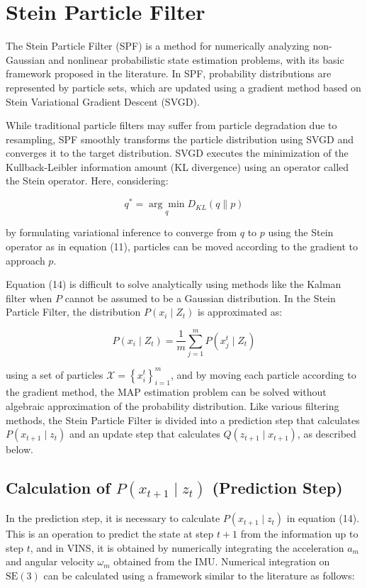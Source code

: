 \documentclass[a4paper,fleqn,10pt,twocolumn]{SICE_ISCS}
\begin{document}
\section{Stein Particle Filter}
The Stein Particle Filter (SPF) is a method for numerically analyzing non-Gaussian and nonlinear probabilistic state estimation problems, with its basic framework proposed in the literature\cite{SPF}. In SPF, probability distributions are represented by particle sets, which are updated using a gradient method based on Stein Variational Gradient Descent (SVGD).

While traditional particle filters may suffer from particle degradation due to resampling, SPF smoothly transforms the particle distribution using SVGD and converges it to the target distribution. SVGD executes the minimization of the Kullback-Leibler information amount (KL divergence) using an operator called the Stein operator. Here, considering:

\begin{equation}
q^{*}=\underset{q}{\arg \min } D_{K L}(q \| p)
\end{equation}

by formulating variational inference to converge from $q$ to $p$ using the Stein operator as in equation (11), particles can be moved according to the gradient to approach $p$.

Equation (14) is difficult to solve analytically using methods like the Kalman filter when $P$ cannot be assumed to be a Gaussian distribution. In the Stein Particle Filter, the distribution $P\left(x_{i} \mid Z_{t}\right)$ is approximated as:

\begin{equation}
P\left(x_{i} \mid Z_{t}\right)=\frac{1}{m} \sum_{j=1}^{m} P\left(x_{j}^{t} \mid Z_{t}\right)
\end{equation}

using a set of particles $\mathcal{X}=\left\{x_{i}^{t}\right\}_{i=1}^{m}$, and by moving each particle according to the gradient method, the MAP estimation problem can be solved without algebraic approximation of the probability distribution. Like various filtering methods, the Stein Particle Filter is divided into a prediction step that calculates $P\left(x_{t+1} \mid z_{t}\right)$ and an update step that calculates $Q\left(z_{t+1} \mid x_{t+1}\right)$, as described below.

\subsection{Calculation of $P\left(x_{t+1} \mid z_{t}\right)$ (Prediction Step)}
In the prediction step, it is necessary to calculate $P\left(x_{t+1} \mid z_{t}\right)$ in equation (14). This is an operation to predict the state at step $t+1$ from the information up to step $t$, and in VINS, it is obtained by numerically integrating the acceleration $a_{m}$ and angular velocity $\omega_{m}$ obtained from the IMU. Numerical integration on $\mathrm{SE}(3)$ can be calculated using a framework similar to the literature\cite{On-Manifold} as follows:
\end{document}
